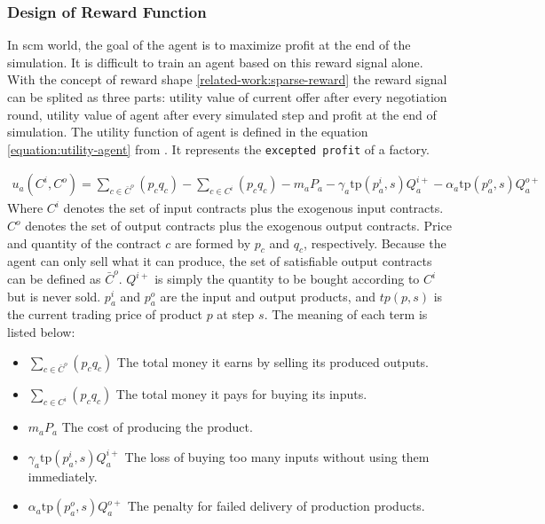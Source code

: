 \subsubsection{Design of Reward Function} 
In \gls{scm} world, the goal of the agent is to maximize profit at the end of the simulation. It is difficult to train an agent based on this reward signal alone. With the concept of reward shape \ref{related-work:sparse-reward} the reward signal can be splited as three parts: utility value of current offer after every negotiation round, utility value of agent after every simulated step and profit at the end of simulation. The utility function of agent is defined in the equation \ref{equation:utility-agent} from \parencite{Mohammad2021}. It represents the \texttt{excepted profit} of a factory.

\begin{equation} \label{equation:utility-agent}
\begin{aligned}
u_{a}\left(C^{i}, C^{o}\right)=\sum_{c \in \bar{C}^{o}}\left(p_{c} q_{c}\right)-\sum_{c \in C^{i}}\left(p_{c} q_{c}\right)-m_{a} P_{a}-\gamma_{a} \mathrm{t} \mathrm{p}\left(p_{a}^{i}, s\right) Q_{a}^{i+}-\alpha_{a} \mathrm{tp}\left(p_{a}^{o}, s\right) Q_{a}^{o+}
\end{aligned}
\end{equation}
Where $C^{i}$ denotes the set of input contracts plus the exogenous input contracts. $C^{o}$ denotes the set of output contracts plus the exogenous output contracts. Price and quantity of the contract $c$ are formed by $p_c$ and $q_c$, respectively. Because the agent can only sell what it can produce, the set of satisfiable output contracts can be defined as $\bar{C}^{o}$. $Q^{i+}$ is simply the quantity to be bought  according to $C^{i}$ but is never sold. $p_{a}^{i}$ and $p_{a}^{o}$ are the input and output products, and $tp(p, s)$ is the current trading price of product $p$ at step $s$. The meaning of each term is listed below:
\begin{itemize}
\item \textbf{$\sum_{c \in \bar{C}^{o}}\left(p_{c} q_{c}\right)$} The total money it earns by selling its produced outputs.  
\item \textbf{$\sum_{c \in C^{i}}\left(p_{c} q_{c}\right)$} The total money it pays for buying its inputs.
\item \textbf{$m_{a} P_{a}$} The cost of producing the product.
\item \textbf{$\gamma_{a} \mathrm{t} \mathrm{p}\left(p_{a}^{i}, s\right) Q_{a}^{i+}$} The loss of buying too many inputs without using them immediately.
\item \textbf{$\alpha_{a} \mathrm{tp}\left(p_{a}^{o}, s\right) Q_{a}^{o+}$} The penalty for failed delivery of production products.
\end{itemize}

